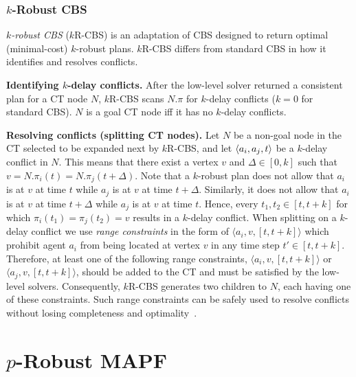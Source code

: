 \documentclass{article}
\newcommand{\krcbs}{$k$R-CBS\xspace}
\begin{document}
\subsubsection{\texorpdfstring{$k$}--Robust CBS}

{\em $k$-robust CBS} (\krcbs{}) is an adaptation of CBS designed to return optimal (minimal-cost) $k$-robust plans. \krcbs{} differs from standard CBS in how it identifies and resolves conflicts.

{\bf Identifying $k$-delay conflicts.} After the low-level solver returned a
consistent plan for a CT node $N$, \krcbs{} scans $N.\pi$ for $k$-delay
conflicts ($k=0$ for standard CBS). 
$N$ is a goal CT node iff it has no $k$-delay
conflicts. 

{\bf Resolving conflicts (splitting CT nodes).} Let $N$ be a non-goal node in
the CT selected to be expanded next by \krcbs, and let $\left \langle a_i, a_j, t \right \rangle $ be
a $k$-delay conflict in $N$. This means that there exist a vertex $v$ and 
$\Delta\in[0,k]$ such that $v=N.\pi_i(t)=N.\pi_j(t+\Delta)$. Note that a
$k$-robust plan does not allow that $a_i$ is at $v$ at time $t$ while $a_j$ is at $v$
at time $t+\Delta$. Similarly, it does not allow that $a_i$ is at $v$ at time $t+\Delta$ while $a_j$ is at $v$ at time $t$. Hence,  every $t_1,t_2\in{[t,t+k]}$ for which $\pi_i(t_1)=\pi_j(t_2)=v$  results in a $k$-delay conflict.  When splitting on a $k$-delay conflict we use {\em range constraints} in the form of $\langle a_i,v,[t,t+k] \rangle$ which prohibit agent $a_i$ from being located at vertex $v$ in any time step $t' \in [t,t+k]$. Therefore, at least one of the following range constraints, $\langle a_i,v,[t,t+k] \rangle$ or $\langle a_j,v,[t,t+k] \rangle$, should be added to the CT and must be satisfied by the low-level solvers. Consequently, \krcbs{} generates two children to $N$, each having one of these constraints. Such range constraints can be safely used to resolve conflicts without losing completeness and optimality~\cite{DBLP:conf/socs/AtzmonSFWBZ18}.


\section{\texorpdfstring{$p$}--Robust MAPF}
\end{document}
